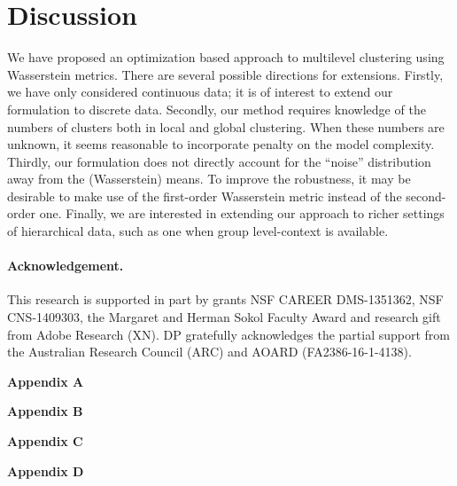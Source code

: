 \documentclass{article}
\theoremstyle{plain}
\theoremstyle{plain}
\numberwithin{theorem}{section}
\numberwithin{proposition}{section}
\numberwithin{lemma}{section}
\numberwithin{definition}{section}
\numberwithin{condition}{section}
\numberwithin{problem}{section}
\numberwithin{corollary}{section}
\numberwithin{assumption}{section}
\numberwithin{example}{section}
\numberwithin{conjecture}{section}
\theoremstyle{definition}
\numberwithin{remark}{section}
\begin{document}
\section{Discussion} \label{Section:discussion}
We have proposed an optimization based approach to multilevel clustering 
using Wasserstein metrics. There are several possible directions for extensions.
Firstly, we have only considered continuous data; it is of interest to extend 
our formulation to discrete data. Secondly, our 
method requires knowledge of the numbers of clusters both in local and global clustering. 
When these numbers are unknown, it seems reasonable to incorporate penalty
on the model complexity. Thirdly,  our formulation does not directly account for the ``noise'' distribution away from the 
(Wasserstein) means.  To improve the robustness, it may be desirable to
make use of the first-order Wasserstein metric instead of the second-order one. 
Finally, we are interested in extending our approach to richer settings of 
hierarchical data, such as one when group level-context is available. 
\vspace{-6pt}
\paragraph{Acknowledgement.} This research is supported in part by grants
NSF CAREER DMS-1351362, NSF CNS-1409303, the Margaret and Herman Sokol 
Faculty Award and research gift from Adobe Research (XN). 
DP gratefully acknowledges the partial support from the 
Australian Research Council (ARC) and AOARD (FA2386-16-1-4138).

\newpage


\newpage
\begin{center}
\textbf{\Large Appendix A}
\end{center}


\begin{center}
\textbf{\Large Appendix B}
\end{center}


\begin{center}
\textbf{\Large Appendix C}
\end{center}


\begin{center}
\textbf{\Large Appendix D}
\end{center}

\end{document}
